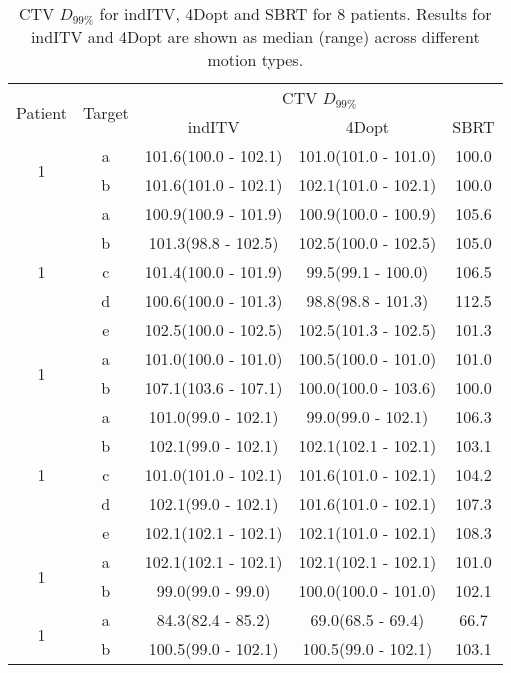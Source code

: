 \begin{table}[H]
	\centering
	\caption{CTV $D_{99\%}$ for indITV, 4Dopt and SBRT for 8 patients. Results for indITV and 4Dopt are shown as median (range) across different motion types.}
	\begin{tabular}{c|c|c|c|c}
		\hline\hline
		\multirow{2}{*}{Patient} & \multirow{2}{*}{Target} & \multicolumn{3}{|c}{CTV $D_{99\%}$} (\%) \\
		 &  & indITV & 4Dopt & SBRT \\
		 \hline
		 
\multirow{2}{*}{1} & a & 101.6(100.0 - 102.1) & 101.0(101.0 - 101.0) & 100.0\\ 
 & b & 101.6(101.0 - 102.1) & 102.1(101.0 - 102.1) & 100.0\\ 
\hline

\multirow{5}{*}{1} & a & 100.9(100.9 - 101.9) & 100.9(100.0 - 100.9) & 105.6\\ 
 & b & 101.3(98.8 - 102.5) & 102.5(100.0 - 102.5) & 105.0\\ 
 & c & 101.4(100.0 - 101.9) & 99.5(99.1 - 100.0) & 106.5\\ 
 & d & 100.6(100.0 - 101.3) & 98.8(98.8 - 101.3) & 112.5\\ 
 & e & 102.5(100.0 - 102.5) & 102.5(101.3 - 102.5) & 101.3\\ 
\hline

\multirow{2}{*}{1} & a & 101.0(100.0 - 101.0) & 100.5(100.0 - 101.0) & 101.0\\ 
 & b & 107.1(103.6 - 107.1) & 100.0(100.0 - 103.6) & 100.0\\ 
\hline

\multirow{5}{*}{1} & a & 101.0(99.0 - 102.1) & 99.0(99.0 - 102.1) & 106.3\\ 
 & b & 102.1(99.0 - 102.1) & 102.1(102.1 - 102.1) & 103.1\\ 
 & c & 101.0(101.0 - 102.1) & 101.6(101.0 - 102.1) & 104.2\\ 
 & d & 102.1(99.0 - 102.1) & 101.6(101.0 - 102.1) & 107.3\\ 
 & e & 102.1(102.1 - 102.1) & 102.1(101.0 - 102.1) & 108.3\\ 
\hline

\multirow{2}{*}{1} & a & 102.1(102.1 - 102.1) & 102.1(102.1 - 102.1) & 101.0\\ 
 & b & 99.0(99.0 - 99.0) & 100.0(100.0 - 101.0) & 102.1\\ 
\hline

\multirow{2}{*}{1} & a & 84.3(82.4 - 85.2) & 69.0(68.5 - 69.4) & 66.7\\ 
 & b & 100.5(99.0 - 102.1) & 100.5(99.0 - 102.1) & 103.1\\ 
\hline


\end{tabular}
\end{table}
